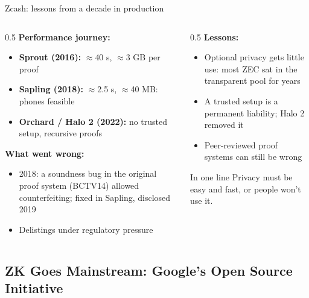 \ifdefined\PRESENTATION\else\PassOptionsToClass{handout}{beamer}\fi\documentclass[aspectratio=169, lualatex]{beamer}
\begin{document}
\begin{frame}{Zcash: lessons from a decade in production}
	\begin{columns}[T]
		\begin{column}{0.5\textwidth}
			\textbf{Performance journey:}
			\begin{itemize}
				\item \textbf{Sprout (2016):} $\approx$40 s, $\approx$3 GB per proof
				\item \textbf{Sapling (2018):} $\approx$2.5 s, $\approx$40 MB: phones feasible
				\item \textbf{Orchard / Halo 2 (2022):} no trusted setup, recursive proofs
			\end{itemize}
			\textbf{What went wrong:}
			\begin{itemize}
				\item 2018: a soundness bug in the original proof system (BCTV14) allowed counterfeiting; fixed in Sapling, disclosed 2019
				\item Delistings under regulatory pressure
			\end{itemize}
		\end{column}
		\begin{column}{0.5\textwidth}
			\textbf{Lessons:}
			\begin{itemize}
				\item Optional privacy gets little use: most ZEC sat in the transparent pool for years
				\item A trusted setup is a permanent liability; Halo 2 removed it
				\item Peer-reviewed proof systems can still be wrong
			\end{itemize}
			\begin{alertblock}{In one line}
				Privacy must be easy and fast, or people won't use it.
			\end{alertblock}
		\end{column}
	\end{columns}
\end{frame}

\subsection{ZK Goes Mainstream: Google's Open Source Initiative}
\end{document}
